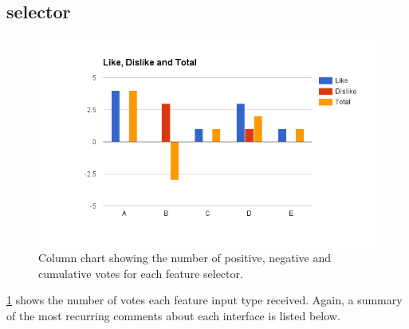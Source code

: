 \documentclass{mproj}
\begin{document}
\subsection{selector}

\begin{figure}[h]
	\centering
	\includegraphics[trim=0cm 0cm 0cm 2cm, width=\textwidth]{images/selector_feedback}
	\caption{Column chart showing the number of positive, negative and cumulative votes for each feature selector.}
	\label{fig:selector_feedback}
\end{figure}

\ref{fig:selector_feedback} shows the number of votes each feature input type received. Again, a summary of the most recurring comments about each interface is listed below.
\end{document}
